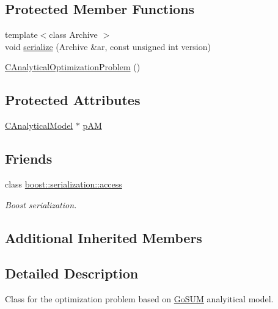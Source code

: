 \subsection*{Protected Member Functions}
\begin{DoxyCompactItemize}
\item 
{\footnotesize template$<$class Archive $>$ }\\void \hyperlink{class_go_s_u_m_1_1_c_analytical_optimization_problem_a258b0f6d24b501a1bb5ca1e65a06e8c5}{serialize} (Archive \&ar, const unsigned int version)
\item 
\hyperlink{class_go_s_u_m_1_1_c_analytical_optimization_problem_af6f91706b131e77c2b539b7e8965bbb1}{C\-Analytical\-Optimization\-Problem} ()
\end{DoxyCompactItemize}
\subsection*{Protected Attributes}
\begin{DoxyCompactItemize}
\item 
\hyperlink{class_go_s_u_m_1_1_c_analytical_model}{C\-Analytical\-Model} $\ast$ \hyperlink{class_go_s_u_m_1_1_c_analytical_optimization_problem_a31c65e8da1ad012c97e4c722120b0b0e}{p\-A\-M}
\end{DoxyCompactItemize}
\subsection*{Friends}
\begin{DoxyCompactItemize}
\item 
class \hyperlink{class_go_s_u_m_1_1_c_analytical_optimization_problem_ac98d07dd8f7b70e16ccb9a01abf56b9c}{boost\-::serialization\-::access}
\begin{DoxyCompactList}\small\item\em Boost serialization. \end{DoxyCompactList}\end{DoxyCompactItemize}
\subsection*{Additional Inherited Members}


\subsection{Detailed Description}
Class for the optimization problem based on \hyperlink{struct_go_s_u_m}{Go\-S\-U\-M} analyitical model. 

